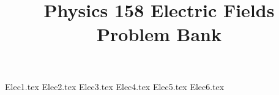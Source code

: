 \documentclass[11pt, fleqn]{article}
\title{Physics 158 Electric Fields Problem Bank}
\author{}
\date{}
\begin{document}
\allowdisplaybreaks

\maketitle

{Elec1.tex}
{Elec2.tex}
{Elec3.tex}
{Elec4.tex}
{Elec5.tex}
{Elec6.tex}
\end{document}
